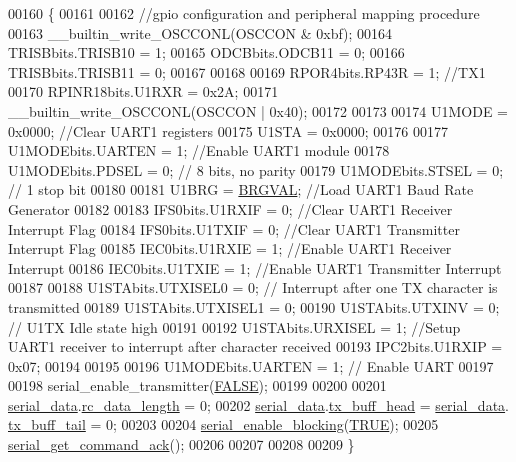 \begin{DoxyCode}
00160 \{
00161 
00162     \textcolor{comment}{//gpio configuration and peripheral mapping procedure}
00163          \_\_builtin\_write\_OSCCONL(OSCCON & 0xbf);
00164              TRISBbits.TRISB10 = 1;
00165              ODCBbits.ODCB11   = 0;
00166              TRISBbits.TRISB11 = 0;
00167       
00168         
00169              RPOR4bits.RP43R   = 1; \textcolor{comment}{//TX1}
00170              RPINR18bits.U1RXR = 0x2A;
00171          \_\_builtin\_write\_OSCCONL(OSCCON | 0x40);
00172 
00173 
00174     U1MODE = 0x0000;            \textcolor{comment}{//Clear UART1 registers}
00175     U1STA  = 0x0000;
00176 
00177     U1MODEbits.UARTEN = 1;      \textcolor{comment}{//Enable UART1 module}
00178     U1MODEbits.PDSEL  = 0;      \textcolor{comment}{// 8 bits, no parity}
00179     U1MODEbits.STSEL  = 0;      \textcolor{comment}{// 1 stop bit}
00180 
00181     U1BRG = \hyperlink{a00030_aca346e181d2ffc089e22e75736a6ff63}{BRGVAL};             \textcolor{comment}{//Load UART1 Baud Rate Generator}
00182 
00183     IFS0bits.U1RXIF   = 0;      \textcolor{comment}{//Clear UART1 Receiver Interrupt Flag}
00184     IFS0bits.U1TXIF   = 0;      \textcolor{comment}{//Clear UART1 Transmitter Interrupt Flag}
00185     IEC0bits.U1RXIE   = 1;      \textcolor{comment}{//Enable UART1 Receiver Interrupt}
00186     IEC0bits.U1TXIE   = 1;      \textcolor{comment}{//Enable UART1 Transmitter Interrupt}
00187 
00188     U1STAbits.UTXISEL0 = 0;     \textcolor{comment}{// Interrupt after one TX character is transmitted}
00189     U1STAbits.UTXISEL1 = 0;
00190     U1STAbits.UTXINV   = 0;     \textcolor{comment}{// U1TX Idle state high}
00191 
00192     U1STAbits.URXISEL  = 1;     \textcolor{comment}{//Setup UART1  receiver to interrupt after character received}
00193     IPC2bits.U1RXIP    = 0x07;
00194     
00195 
00196     U1MODEbits.UARTEN  = 1;     \textcolor{comment}{// Enable UART}
00197 
00198     serial\_enable\_transmitter(\hyperlink{a00040_aa93f0eb578d23995850d61f7d61c55c1}{FALSE});
00199     
00200 
00201     \hyperlink{a00030_a77d3b77ccd59a0065642bf1ac7887b9d}{serial\_data}.\hyperlink{a00030_ab136d4fef2c523afd55b6ca74c46d7cc}{rc\_data\_length} = 0;
00202     \hyperlink{a00030_a77d3b77ccd59a0065642bf1ac7887b9d}{serial\_data}.\hyperlink{a00030_a3e2eda0a020422511de91b2bc7386083}{tx\_buff\_head} = \hyperlink{a00030_a77d3b77ccd59a0065642bf1ac7887b9d}{serial\_data}.
      \hyperlink{a00030_a6287e1447d7902b8bbc2f6359065dcbd}{tx\_buff\_tail} = 0;
00203 
00204     \hyperlink{a00030_af15ca641f181de14f789d97b00c367ef}{serial\_enable\_blocking}(\hyperlink{a00040_aa8cecfc5c5c054d2875c03e77b7be15d}{TRUE});
00205     \hyperlink{a00030_a7fc7421ed15d6e4516e9878e7455d715}{serial\_get\_command\_ack}();
00206 
00207 
00208 
00209 \}
\end{DoxyCode}


